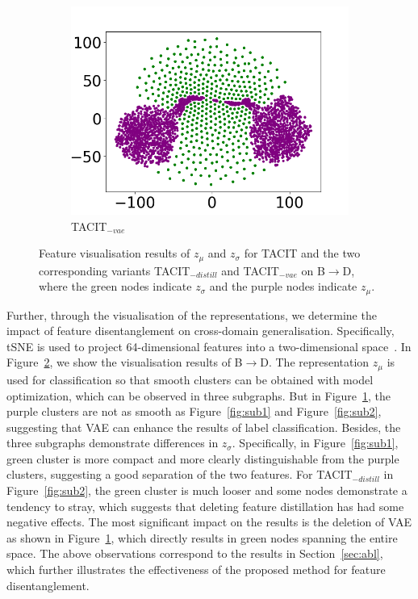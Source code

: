 \documentclass[letterpaper]{article} %
\begin{document}
\begin{figure}[t]
\begin{subfigure}{0.46\linewidth}
		\includegraphics[width=\linewidth]{vis-vae.png}
		\caption{TACIT$_{-vae}$}
		\label{fig:sub3}
	\end{subfigure}
	\caption{Feature visualisation results of $z_\mu$ and $z_\sigma$ for TACIT and the two corresponding variants TACIT$_{-distill}$ and TACIT$_{-vae}$ on B$\to$D, where the green nodes indicate $z_\sigma$ and the purple nodes indicate $z_\mu$. }
	\label{fig:vis}
\end{figure}

Further, through the visualisation of the representations, we determine the impact of feature disentanglement on cross-domain generalisation. Specifically, tSNE is used to project 64-dimensional features into a two-dimensional space~\cite{vandermaaten08a}. In Figure~\ref{fig:vis}, we show the visualisation results of B$\to$D. The representation $z_\mu$ is used for classification so that smooth clusters can be obtained with model optimization, which can be observed in three subgraphs. But in Figure~\ref{fig:sub3}, the purple clusters are not as smooth as Figure~\ref{fig:sub1} and Figure~\ref{fig:sub2}, suggesting that VAE can enhance the results of label classification. Besides, the three subgraphs demonstrate differences in $z_\sigma$. Specifically, in Figure~\ref{fig:sub1}, green cluster is more compact and more clearly distinguishable from the purple clusters, suggesting a good separation of the two features. For TACIT$_{-distill}$ in Figure~\ref{fig:sub2}, the green cluster is much looser and some nodes demonstrate a tendency to stray, which suggests that deleting feature distillation has had some negative effects. The most significant impact on the results is the deletion of VAE as shown in Figure~\ref{fig:sub3}, which directly results in green nodes spanning the entire space. The above observations correspond to the results in Section~\ref{sec:abl}, which further illustrates the effectiveness of the proposed method for feature disentanglement. 
\end{document}
